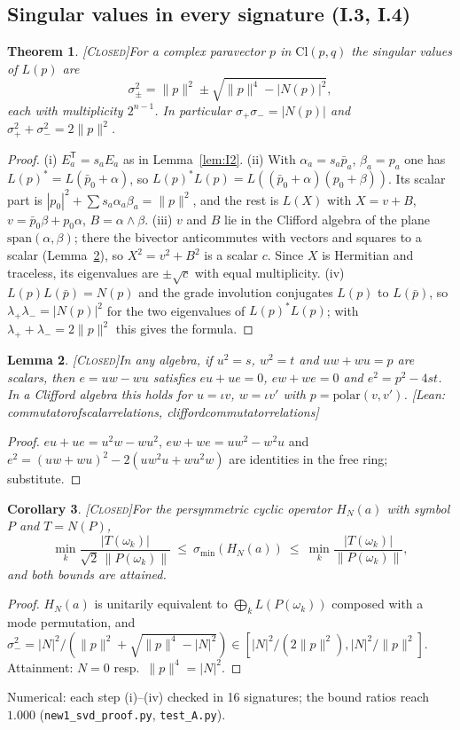 \documentclass[11pt]{amsart}
\theoremstyle{plain}
\newtheorem{theorem}{Theorem}[section]
\newtheorem{lemma}[theorem]{Lemma}
\newtheorem{corollary}[theorem]{Corollary}
\theoremstyle{definition}
\newcommand{\Cl}{\mathrm{Cl}}
\newcommand{\status}[1]{\textsc{[#1]}}
\newcommand{\leanus}{\textunderscore\allowbreak}
\newcommand{\lean}[1]{{\ttfamily\let\_\leanus #1}}
\begin{document}
\subsection{Singular values in every signature (I.3, I.4)}
\begin{theorem}\status{Closed}\label{thm:sv}
For a complex paravector $p$ in $\Cl(p,q)$ the singular values of $L(p)$ are
\[
\sigma_\pm^2=\|p\|^2\pm\sqrt{\|p\|^4-|N(p)|^2},
\]
each with multiplicity $2^{n-1}$. In particular $\sigma_+\sigma_-=|N(p)|$ and
$\sigma_+^2+\sigma_-^2=2\|p\|^2$.
\end{theorem}
\begin{proof}
(i) $E_a^{\mathsf T}=s_aE_a$ as in Lemma~\ref{lem:I2}. (ii) With
$\alpha_a=s_a\bar p_a$, $\beta_a=p_a$ one has $L(p)^*=L(\bar p_0+\alpha)$, so
$L(p)^*L(p)=L((\bar p_0+\alpha)(p_0+\beta))$. Its scalar part is
$|p_0|^2+\sum s_a\alpha_a\beta_a=\|p\|^2$, and the rest is $L(X)$ with
$X=v+B$, $v=\bar p_0\beta+p_0\alpha$, $B=\alpha\wedge\beta$. (iii) $v$ and $B$ lie
in the Clifford algebra of the plane $\mathrm{span}(\alpha,\beta)$; there the
bivector anticommutes with vectors and squares to a scalar
(Lemma~\ref{lem:two-vector}), so $X^2=v^2+B^2$ is a scalar $c$. Since $X$ is
Hermitian and traceless, its eigenvalues are $\pm\sqrt c$ with equal
multiplicity. (iv) $L(p)L(\bar p)=N(p)$ and the grade involution conjugates
$L(p)$ to $L(\bar p)$, so $\lambda_+\lambda_-=|N(p)|^2$ for the two eigenvalues
of $L(p)^*L(p)$; with $\lambda_++\lambda_-=2\|p\|^2$ this gives the formula.
\end{proof}
\begin{lemma}\status{Closed}\label{lem:two-vector}
In any algebra, if $u^2=s$, $w^2=t$ and $uw+wu=p$ are scalars, then
$e=uw-wu$ satisfies $eu+ue=0$, $ew+we=0$ and $e^2=p^2-4st$. In a Clifford
algebra this holds for $u=\iota v$, $w=\iota v'$ with $p=\mathrm{polar}(v,v')$.
\lean{[Lean: commutator\_of\_scalar\_relations, clifford\_commutator\_relations]}
\end{lemma}
\begin{proof}
$eu+ue=u^2w-wu^2$, $ew+we=uw^2-w^2u$ and
$e^2=(uw+wu)^2-2(uw^2u+wu^2w)$ are identities in the free ring; substitute.
\end{proof}
\begin{corollary}\status{Closed}\label{cor:near-kernel}
For the persymmetric cyclic operator $H_N(a)$ with symbol $P$ and $T=N(P)$,
\[
\min_k\frac{|T(\omega_k)|}{\sqrt2\,\|P(\omega_k)\|}\ \le\ \sigma_{\min}(H_N(a))\ \le\ \min_k\frac{|T(\omega_k)|}{\|P(\omega_k)\|},
\]
and both bounds are attained.
\end{corollary}
\begin{proof}
$H_N(a)$ is unitarily equivalent to $\bigoplus_kL(P(\omega_k))$ composed with a
mode permutation, and $\sigma_-^2=|N|^2/(\|p\|^2+\sqrt{\|p\|^4-|N|^2})\in
[|N|^2/(2\|p\|^2),|N|^2/\|p\|^2]$. Attainment: $N=0$ resp.\ $\|p\|^4=|N|^2$.
\end{proof}
\noindent Numerical: each step (i)--(iv) checked in 16 signatures; the bound
ratios reach $1.000$ (\texttt{new1\_svd\_proof.py}, \texttt{test\_A.py}).
\end{document}
